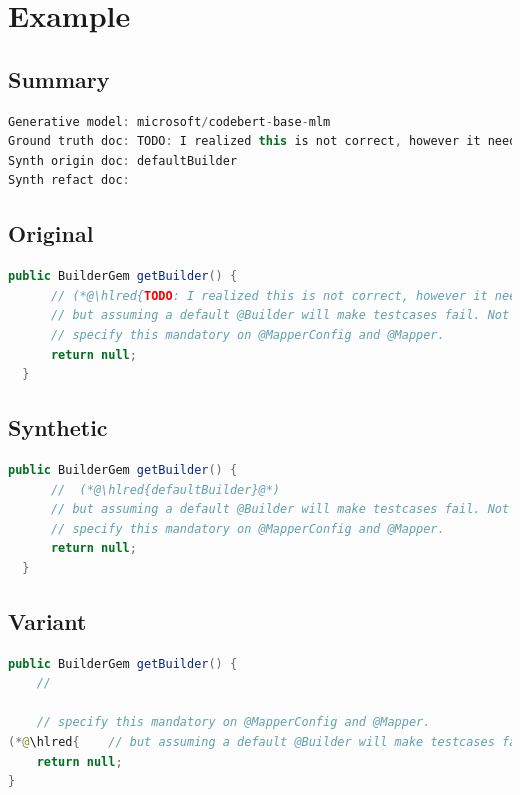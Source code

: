 \documentclass[usenames,dvipsnames]{article} %
\DeclareRobustCommand{\hlred}[1]{{\sethlcolor{pink}\hl{#1}}}
\begin{document}
  \pagebreak
  \section{Example}
  \subsection{Summary}

  \begin{lstlisting}[language=java]
Generative model: microsoft/codebert-base-mlm
Ground truth doc: TODO: I realized this is not correct, however it needs to be null in order to keep downward compatibility
Synth origin doc: defaultBuilder
Synth refact doc:
  \end{lstlisting}

  \subsection{Original}
  \begin{lstlisting}[language=java]
  public BuilderGem getBuilder() {
      // (*@\hlred{TODO: I realized this is not correct, however it needs to be null in order to keep downward compatibility}@*)
      // but assuming a default @Builder will make testcases fail. Not having a default means that you need to
      // specify this mandatory on @MapperConfig and @Mapper.
      return null;
  }
  \end{lstlisting}
  \subsection{Synthetic}

  \begin{lstlisting}[language=java]
  public BuilderGem getBuilder() {
      //  (*@\hlred{defaultBuilder}@*)
      // but assuming a default @Builder will make testcases fail. Not having a default means that you need to
      // specify this mandatory on @MapperConfig and @Mapper.
      return null;
  }
  \end{lstlisting}

  \subsection{Variant}

  \begin{lstlisting}[language=java]
public BuilderGem getBuilder() {
    //

    // specify this mandatory on @MapperConfig and @Mapper.
(*@\hlred{    // but assuming a default @Builder will make testcases fail. Not having a default means that you need to}@*)
    return null;
}
  \end{lstlisting}
\end{document}
